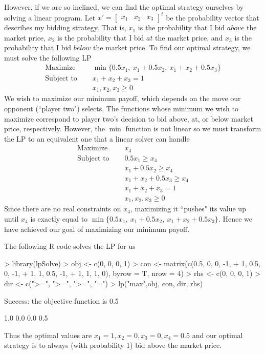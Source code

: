 \documentclass[11pt, oneside]{article}
\begin{document}
However, if we are so inclined, we can find the optimal strategy ourselves
by solving a linear program. Let $x' = \begin{bmatrix}x_1 & x_2 & x_3\end{bmatrix}^t$ 
be the probability vector that describes my bidding strategy. 
That is, $x_1$ is  the probability that I bid $above$ the market price, $x_2$ 
is the probability that I bid $at$ the market price, and $x_3$ is the 
probability that I bid $below$ the market price. To find our optimal 
strategy, we must solve the following LP
\begin{align*}
\text{Maximize~~~~}&\min\{0.5x_1,~x_1 +0.5x_2,~x_1 + x_2+0.5x_3\}\\
\text{Subject to~~~~}&x_1 + x_2 + x_3 = 1\\
&x_1, x_2, x_3 \ge 0
\end{align*}
We wish to maximize our minimum payoff, which depends on the move
our opponent (``player two") selects. The functions whose minimum we wish
to maximize correspond to 
player two's decision to bid above, at, or below market price, respectively.
However, the $\min$ function is not linear so we must transform the LP 
to an equivalent one that a linear solver can handle
\begin{align*}
\text{Maximize~~~~}&x_4\\
\text{Subject to~~~~}&0.5x_1 \ge x_4 \\
&x_1 +0.5x_2 \ge x_4\\
&x_1 + x_2+0.5x_3 \ge x_4\\
&x_1 + x_2 + x_3 = 1\\
&x_1, x_2, x_3 \ge 0
\end{align*}
Since there are no real constraints on $x_4$, maximizing it ``pushes" its value
up until $x_4$ is exactly equal to 
$\min\{0.5x_1,~x_1 +0.5x_2,~x_1 + x_2+0.5x_3\}$. Hence we have achieved our goal
of maximizing our minimum payoff.

The following R code solves the LP for us
\begin{Schunk}
\begin{Sinput}
> library(lpSolve)
> obj <- c(0, 0, 0, 1)
> con <- matrix(c(0.5, 0, 0, -1,
+                 1, 0.5, 0, -1,
+                 1, 1, 0.5, -1,
+                 1, 1, 1, 0), byrow = T, nrow = 4)
> rhs <- c(0, 0, 0, 1)
> dir <- c(">=", ">=", ">=", "=")
> lp("max",obj, con, dir, rhs)
\end{Sinput}
\begin{Soutput}
Success: the objective function is 0.5 
\end{Soutput}
\begin{Soutput}
[1] 1.0 0.0 0.0 0.5
\end{Soutput}
\end{Schunk}
Thus the optimal values are $x_1 = 1, x_2 = 0, x_3 = 0, 
x_4 = 0.5$ and our optimal strategy is to always (with probability 1) bid 
above the market price.
\end{document}
